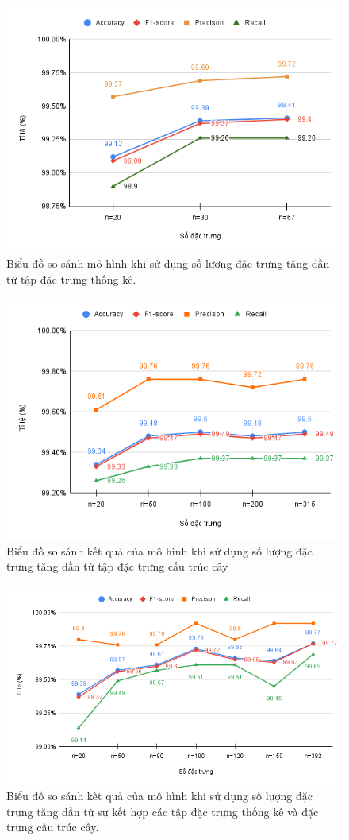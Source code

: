 \documentclass[./../main.tex]{subfiles}
\begin{document}
\begin{figure}[H]
	\centering
	\includegraphics[width=0.8\linewidth]{./images/exp1_top_all_general_feat.png}
	\caption{Biểu đồ so sánh mô hình khi sử dụng số lượng đặc trưng tăng dần từ tập đặc trưng thống kê.}
	\label{fig:exp1_top_all_general_feat}
\end{figure}

\begin{figure}[H]
	\centering
	\includegraphics[width=0.8\linewidth]{./images/exp1_top_all_structual_path.png}
	\caption{Biểu đồ so sánh kết quả của mô hình khi sử dụng số lượng đặc trưng tăng dần từ tập đặc trưng cấu trúc cây}
	\label{fig:exp1_top_all_structual_path}
\end{figure}

\begin{figure}[H]
	\centering
	\includegraphics[width=0.8\linewidth]{./images/exp1_top_all_feat.png}
	\caption{Biểu đồ so sánh kết quả của mô hình khi sử dụng số lượng đặc trưng tăng dần từ sự kết hợp các tập đặc trưng thống kê và đặc trưng cấu trúc cây.}
	\label{fig:exp1_top_all_feat}
\end{figure}
\end{document}
